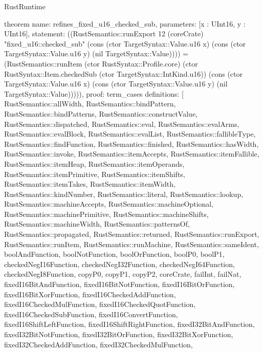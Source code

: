 \begin{lexlean}{RustRuntime}
\begin{semanticmodule}
theorem{
  name: refines_fixed_u16_checked_sub,
  parameters: [x : UInt16, y : UInt16],
  statement: ((RustSemantics::runExport 12 (coreCrate) "fixed_u16::checked_sub" (cons (ctor TargetSyntax::Value.u16 x) (cons (ctor TargetSyntax::Value.u16 y) (nil TargetSyntax::Value)))) = (RustSemantics::runItem (ctor RustSyntax::Profile.core) (ctor RustSyntax::Item.checkedSub (ctor TargetSyntax::IntKind.u16)) (cons (ctor TargetSyntax::Value.u16 x) (cons (ctor TargetSyntax::Value.u16 y) (nil TargetSyntax::Value))))),
  proof: term_cases{
    definitions: [
      RustSemantics::allWidth,
      RustSemantics::bindPattern,
      RustSemantics::bindPatterns,
      RustSemantics::constructValue,
      RustSemantics::dispatched,
      RustSemantics::eval,
      RustSemantics::evalArms,
      RustSemantics::evalBlock,
      RustSemantics::evalList,
      RustSemantics::fallibleType,
      RustSemantics::findFunction,
      RustSemantics::finished,
      RustSemantics::hasWidth,
      RustSemantics::invoke,
      RustSemantics::itemAccepts,
      RustSemantics::itemFallible,
      RustSemantics::itemHeap,
      RustSemantics::itemOperands,
      RustSemantics::itemPrimitive,
      RustSemantics::itemShifts,
      RustSemantics::itemTakes,
      RustSemantics::itemWidth,
      RustSemantics::kindNumber,
      RustSemantics::literal,
      RustSemantics::lookup,
      RustSemantics::machineAccepts,
      RustSemantics::machineOptional,
      RustSemantics::machinePrimitive,
      RustSemantics::machineShifts,
      RustSemantics::machineWidth,
      RustSemantics::patternsOf,
      RustSemantics::propagated,
      RustSemantics::returned,
      RustSemantics::runExport,
      RustSemantics::runItem,
      RustSemantics::runMachine,
      RustSemantics::sameIdent,
      boolAndFunction,
      boolNotFunction,
      boolOrFunction,
      boolP0,
      boolP1,
      checkedNegI16Function,
      checkedNegI32Function,
      checkedNegI64Function,
      checkedNegI8Function,
      copyP0,
      copyP1,
      copyP2,
      coreCrate,
      failInt,
      failNat,
      fixedI16BitAndFunction,
      fixedI16BitNotFunction,
      fixedI16BitOrFunction,
      fixedI16BitXorFunction,
      fixedI16CheckedAddFunction,
      fixedI16CheckedMulFunction,
      fixedI16CheckedQuotFunction,
      fixedI16CheckedSubFunction,
      fixedI16ConvertFunction,
      fixedI16ShiftLeftFunction,
      fixedI16ShiftRightFunction,
      fixedI32BitAndFunction,
      fixedI32BitNotFunction,
      fixedI32BitOrFunction,
      fixedI32BitXorFunction,
      fixedI32CheckedAddFunction,
      fixedI32CheckedMulFunction,
}}
\end{semanticmodule}
\end{lexlean}
